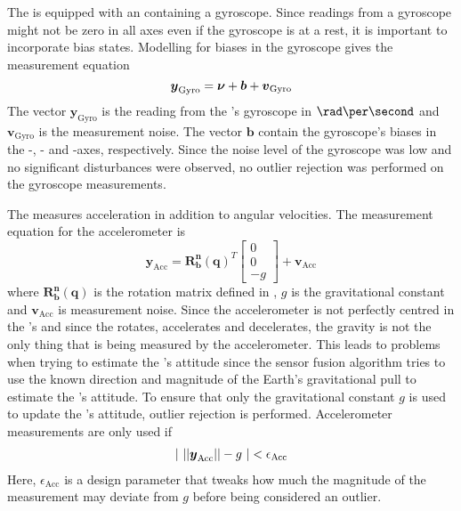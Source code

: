 The \abbrROV is equipped with an \abbrIMU containing a gyroscope. Since readings from a gyroscope might not be zero in all axes even if the gyroscope is at a rest, it is important to incorporate bias states. Modelling for biases in the gyroscope gives the measurement equation
\begin{equation}\label{eq:gyro}
\boldsymbol{y}_\text{Gyro}= \boldsymbol{\nu} + \boldsymbol{b} + \boldsymbol{v}_{\text{Gyro}}
\end{equation}
 The vector $\boldsymbol{y}_\text{Gyro}$ is the reading from the \abbrIMU's gyroscope in $\rad\per\second$ and $\boldsymbol{v}_{\text{Gyro}}$ is the measurement noise. The vector $\boldsymbol{b}$ contain the gyroscope's biases in the \xPosition-, \yPosition- and \zPosition-axes, respectively.
Since the noise level of the gyroscope was low and no significant disturbances were observed, no outlier rejection was performed on the gyroscope measurements. %

The \abbrIMU measures acceleration in addition to angular velocities. The measurement equation for the accelerometer is
\begin{equation}
\boldsymbol{y}_{\text{Acc}} =
    \boldsymbol{R^n_b}(\boldsymbol{q})^T
    \begin{bmatrix}
    0\\
    0\\
    -g
    \end{bmatrix}
+ \boldsymbol{v}_{\text{Acc}}
\end{equation}
    where $\boldsymbol{R^n_b}(\boldsymbol{q})$ is the rotation matrix defined in , $g$ is the gravitational constant and $\boldsymbol{v}_{\text{Acc}}$ is measurement noise. Since the accelerometer is not perfectly centred in the \abbrROV's \abbrCG and since the \abbrROV rotates, accelerates and decelerates, the gravity is not the only thing that is being measured by the accelerometer. This leads to problems when trying to estimate the \abbrROV's attitude since the sensor fusion algorithm tries to use the known direction and magnitude of the Earth's gravitational pull to estimate the \abbrROV's attitude. To ensure that only the gravitational constant $g$ is used to update the \abbrROV's attitude, outlier rejection is performed. Accelerometer measurements are only used if 
\begin{align}
    |~||
    \boldsymbol{y}_{\text{Acc}}
||
    -g
     ~| < \epsilon_{\text{Acc}}
\end{align}
Here, $\epsilon_{\text{Acc}}$ is a design parameter that tweaks how much the magnitude of the measurement may deviate from $g$ before being considered an outlier.

